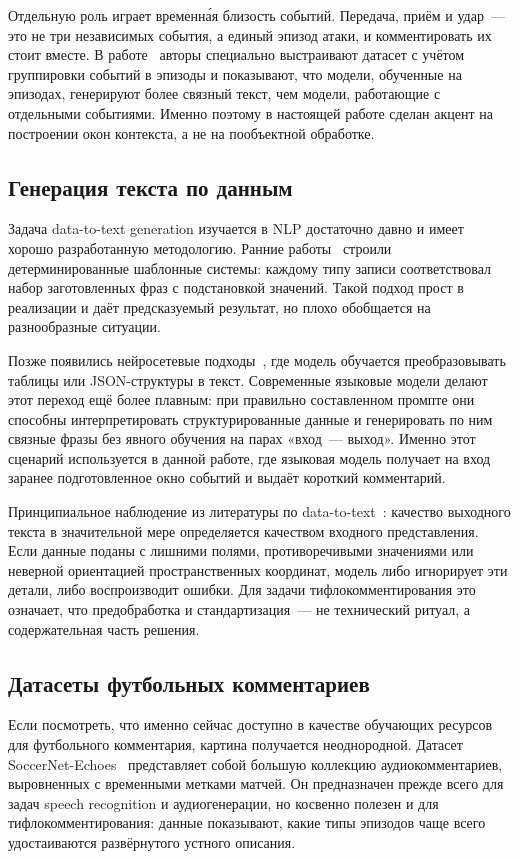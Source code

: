 \documentclass[a4paper,14pt]{extarticle}
\numberwithin{table}{section}
\numberwithin{figure}{section}
\numberwithin{equation}{section}
\begin{document}
Отдельную роль играет временн\'{а}я близость событий. Передача, приём и удар~--- это не три независимых события, а единый эпизод атаки, и комментировать их стоит вместе. В работе~\cite{lfc2025} авторы специально выстраивают датасет с учётом группировки событий в эпизоды и показывают, что модели, обученные на эпизодах, генерируют более связный текст, чем модели, работающие с отдельными событиями. Именно поэтому в настоящей работе сделан акцент на построении окон контекста, а не на пообъектной обработке.

\subsection{Генерация текста по данным}

Задача data-to-text generation изучается в NLP достаточно давно и имеет хорошо разработанную методологию. Ранние работы~\cite{data2text} строили детерминированные шаблонные системы: каждому типу записи соответствовал набор заготовленных фраз с подстановкой значений. Такой подход прост в реализации и даёт предсказуемый результат, но плохо обобщается на разнообразные ситуации.

Позже появились нейросетевые подходы~\cite{record2text}, где модель обучается преобразовывать таблицы или JSON-структуры в текст. Современные языковые модели делают этот переход ещё более плавным: при правильно составленном промпте они способны интерпретировать структурированные данные и генерировать по ним связные фразы без явного обучения на парах «вход~--- выход». Именно этот сценарий используется в данной работе, где языковая модель получает на вход заранее подготовленное окно событий и выдаёт короткий комментарий.

Принципиальное наблюдение из литературы по data-to-text~\cite{data2text,record2text}: качество выходного текста в значительной мере определяется качеством входного представления. Если данные поданы с лишними полями, противоречивыми значениями или неверной ориентацией пространственных координат, модель либо игнорирует эти детали, либо воспроизводит ошибки. Для задачи тифлокомментирования это означает, что предобработка и стандартизация~--- не технический ритуал, а содержательная часть решения.

\subsection{Датасеты футбольных комментариев}

Если посмотреть, что именно сейчас доступно в качестве обучающих ресурсов для футбольного комментария, картина получается неоднородной. Датасет SoccerNet-Echoes~\cite{soccernet_echoes} представляет собой большую коллекцию аудиокомментариев, выровненных с временными метками матчей. Он предназначен прежде всего для задач speech recognition и аудиогенерации, но косвенно полезен и для тифлокомментирования: данные показывают, какие типы эпизодов чаще всего удостаиваются развёрнутого устного описания.
\end{document}
